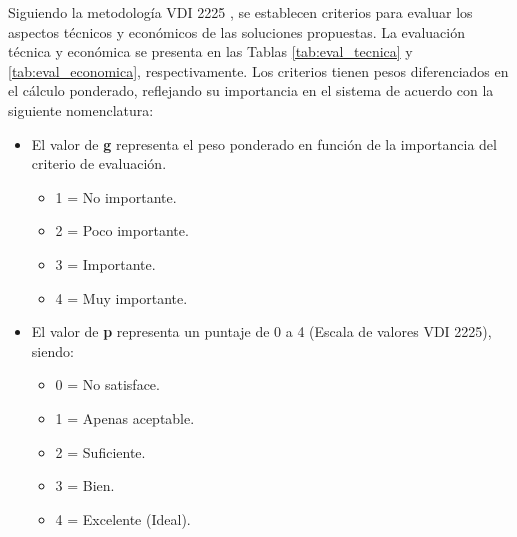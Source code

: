 Siguiendo la metodología VDI 2225 \cite{VDI2225_series}, se establecen criterios para evaluar los aspectos técnicos y económicos de las soluciones propuestas. La evaluación técnica y económica se presenta en las Tablas \ref{tab:eval_tecnica} y \ref{tab:eval_economica}, respectivamente. Los criterios tienen pesos diferenciados en el cálculo ponderado, reflejando su importancia en el sistema de acuerdo con la siguiente nomenclatura:

\begin{itemize}
	\setlength\itemsep{0em}
	\item El valor de \textbf{g} representa el peso ponderado en función de la importancia del criterio de evaluación.
	\begin{itemize}
		\setlength\itemsep{0em}
		\item 1 = No importante.
		\item 2 = Poco importante.
		\item 3 = Importante.
		\item 4 = Muy importante.
	\end{itemize}
	\item El valor de \textbf{p} representa un puntaje de 0 a 4 (Escala de valores VDI 2225), siendo:
	\begin{itemize}
		\setlength\itemsep{0em}
		\item 0 = No satisface.
		\item 1 = Apenas aceptable.
		\item 2 = Suficiente.
		\item 3 = Bien.
		\item 4 = Excelente (Ideal).
	\end{itemize}
\end{itemize}


